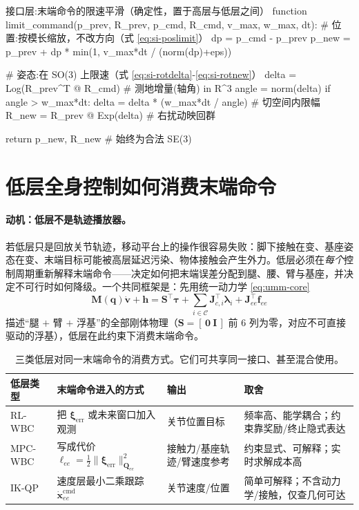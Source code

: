 \begin{codebox}[text]{接口层:末端命令的限速平滑（确定性，置于高层与低层之间）}
function limit_command(p_prev, R_prev, p_cmd, R_cmd, v_max, w_max, dt):
    # 位置:按模长缩放，不改方向（式 \ref{eq:si-poslimit}）
    dp        = p_cmd - p_prev
    p_new     = p_prev + dp * min(1, v_max*dt / (norm(dp)+eps))

    # 姿态:在 SO(3) 上限速（式 \ref{eq:si-rotdelta}-\ref{eq:si-rotnew}）
    delta     = Log(R_prev^T @ R_cmd)          # 测地增量(轴角) in R^3
    angle     = norm(delta)
    if angle > w_max*dt:
        delta = delta * (w_max*dt / angle)     # 切空间内限幅
    R_new     = R_prev @ Exp(delta)            # 右扰动映回群

    return p_new, R_new                        # 始终为合法 SE(3)
\end{codebox}

\section{低层全身控制如何消费末端命令}
\label{sec:si-lowlevel}

\paragraph{动机：低层不是轨迹播放器。}
若低层只是回放关节轨迹，移动平台上的操作很容易失败：脚下接触在变、基座姿态在变、末端目标可能被高层延迟污染、物体接触会产生外力。低层必须在\emph{每个}控制周期重新解释末端命令——决定如何把末端误差分配到腿、腰、臂与基座，并决定不可行时如何降级。一个共同框架是：先用统一动力学 \cref{eq:umm-core}
\[
  \mathbf M(\mathbf q)\dot{\mathbf v}+\mathbf h=\mathbf S^\top\boldsymbol\tau+\textstyle\sum_{i\in\mathcal C}\mathbf J_{c,i}^\top\boldsymbol\lambda_i+\mathbf J_{ee}^\top\mathbf f_{ee}
\]
描述“腿 $+$ 臂 $+$ 浮基”的全部刚体物理（$\mathbf S=[\,\mathbf 0\ \mathbf I\,]$ 前 $6$ 列为零，对应不可直接驱动的浮基），低层在此约束下消费末端命令。

\begin{table}[H]\centering\small
\caption{三类低层对同一末端命令的消费方式。它们可共享同一接口、甚至混合使用。}
\label{tab:si-lowlevel}
\begin{tabular}{p{2.0cm}p{3.3cm}p{2.6cm}p{2.9cm}}
\toprule
低层类型 & 末端命令进入的方式 & 输出 & 取舍 \\
\midrule
RL-WBC & 把 $\boldsymbol\xi_{\mathrm{err}}$ 或未来窗口加入观测 & 关节位置目标 & 频率高、能学耦合；约束靠奖励/终止隐式表达 \\
MPC-WBC & 写成代价 $\ell_{ee}=\tfrac12\|\boldsymbol\xi_{\mathrm{err}}\|_{\mathbf Q_{ee}}^2$ & 接触力/基座轨迹/臂速度参考 & 约束显式、可解释；实时求解成本高 \\
IK-QP & 速度层最小二乘跟踪 $\dot{\mathbf x}_{ee}^{\mathrm{cmd}}$ & 关节速度/位置 & 简单可解释；不含动力学/接触，仅查几何可达 \\
\bottomrule
\end{tabular}
\end{table}

